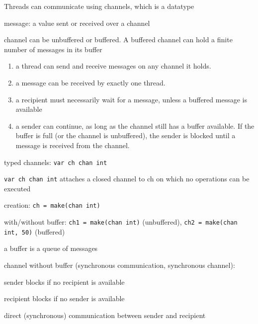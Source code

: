 \documentclass[landscape, a4paper]{article}
\begin{document}
\begin{minipage}[t]{0.2\linewidth}
	\begin{betterlist}
		\item Threads can communicate using channels, which is a datatype
		\item \alert{message:} a value sent or received over a channel
		\item channel can be \alert{unbuffered} or \alert{buffered}. A buffered channel can hold a finite number of messages in its buffer
		\item {}
		\begin{enumerate}
			\item a thread can send and receive messages on any channel it holds.
			\item a message can be received by exactly one thread.
			\item a recipient must necessarily wait for a message, unless a buffered message is available
			\item a sender can continue, as long as the channel still has a buffer available. If the buffer is full (or the channel is unbuffered), the sender is blocked until a message is received from the channel.
		\end{enumerate}
		\item \alert{typed channels:} \verb|var ch chan int|
		\begin{betterlist}
			\item \verb|var ch chan int| attaches a closed channel to ch on which no operations can be executed
		\end{betterlist}
		\item \alert{creation:} \verb|ch = make(chan int)|
		\item \alert{with/without buffer:} \verb|ch1 = make(chan int)| (unbuffered), \verb|ch2 = make(chan int, 50)| (buffered)
		\begin{betterlist}
			\item a buffer is a queue of messages
			\item {}
			\begin{betterlist}
				\item channel without buffer (synchronous communication, synchronous channel):
				\begin{betterlist}
					\item sender blocks if no recipient is available
					\item recipient blocks if no sender is available
					\item direct (synchronous) communication between sender and recipient

\end{betterlist}
\end{betterlist}
\end{betterlist}
\end{betterlist}
\end{minipage}
\end{document}
